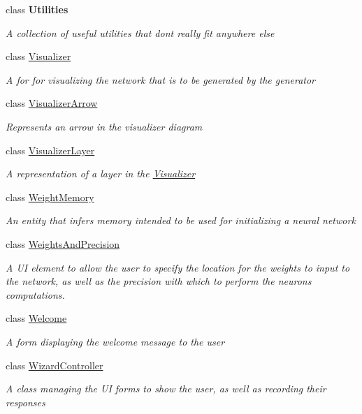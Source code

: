 \begin{DoxyCompactItemize}
class {\bfseries Utilities}
\begin{DoxyCompactList}\small\item\em A collection of useful utilities that don\textquotesingle{}t really fit anywhere else \end{DoxyCompactList}\item 
class \hyperlink{class_n_n_gen_1_1_visualizer}{Visualizer}
\begin{DoxyCompactList}\small\item\em A for for visualizing the network that is to be generated by the generator \end{DoxyCompactList}\item 
class \hyperlink{class_n_n_gen_1_1_visualizer_arrow}{Visualizer\+Arrow}
\begin{DoxyCompactList}\small\item\em Represents an arrow in the visualizer diagram \end{DoxyCompactList}\item 
class \hyperlink{class_n_n_gen_1_1_visualizer_layer}{Visualizer\+Layer}
\begin{DoxyCompactList}\small\item\em A representation of a layer in the \hyperlink{class_n_n_gen_1_1_visualizer}{Visualizer} \end{DoxyCompactList}\item 
class \hyperlink{class_n_n_gen_1_1_weight_memory}{Weight\+Memory}
\begin{DoxyCompactList}\small\item\em An entity that infers memory intended to be used for initializing a neural network \end{DoxyCompactList}\item 
class \hyperlink{class_n_n_gen_1_1_weights_and_precision}{Weights\+And\+Precision}
\begin{DoxyCompactList}\small\item\em A U\+I element to allow the user to specify the location for the weights to input to the network, as well as the precision with which to perform the neuron\textquotesingle{}s computations. \end{DoxyCompactList}\item 
class \hyperlink{class_n_n_gen_1_1_welcome}{Welcome}
\begin{DoxyCompactList}\small\item\em A form displaying the welcome message to the user \end{DoxyCompactList}\item 
class \hyperlink{class_n_n_gen_1_1_wizard_controller}{Wizard\+Controller}
\begin{DoxyCompactList}\small\item\em A class managing the U\+I forms to show the user, as well as recording their responses \end{DoxyCompactList}\end{DoxyCompactItemize}
